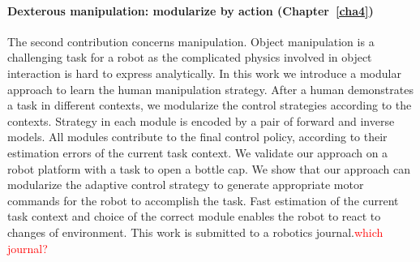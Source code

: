 
\paragraph{Dexterous manipulation: modularize by action (Chapter~\ref{cha4})}
The second contribution concerns manipulation. Object manipulation is a challenging task for a robot as the complicated physics involved in object interaction is hard to express analytically. In this work we introduce a modular approach to learn the human manipulation strategy. After a human demonstrates a task in different contexts, we modularize the control strategies according to the contexts. Strategy in each module is encoded by a pair of forward and inverse models. All modules contribute to the final control policy, according to their estimation errors of the current task context. We validate our approach on a robot platform with a task to open a bottle cap. We show that our approach can modularize the adaptive control strategy to generate appropriate motor commands for the robot to accomplish the task. Fast estimation of the current task context and choice of the correct module enables the robot to react to changes of environment. This work is submitted to a robotics journal.\textcolor{red}{which journal?}


